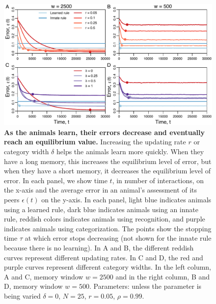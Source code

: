 \begin{figure}
\includegraphics[width=6.85in]{figures/speed_accuracy_tradeoff.pdf}
\caption{\sffamily\small\textbf{As the animals learn, their errors decrease and eventually reach an equilibrium value.} Increasing the updating rate $r$ or category width $\delta$ helps the animals learn more quickly. When they have a long memory, this increases the equilibrium level of error, but when they have a short memory, it decreases the equilibrium level of error. In each panel, we show time $t$, in number of interactions, on the x-axis and the average error in an animal's assessment of its peers $\epsilon(t)$ on the y-axis. In each panel, light blue indicates animals using a learned rule, dark blue indicates animals using an innate rule, reddish colors indicates animals using recognition, and purple indicates animals using categorization. The points show the stopping time $\tau$ at which error stops decreasing (not shown for the innate rule because there is no learning). In A and B, the different reddish curves represent different updating rates. In C and D, the red and purple curves represent different category widths. In the left column, A and C, memory window $w=2500$ and in the right column, B and D, memory window $w=500$. Parameters: unless the parameter is being varied $\delta=0$, $N=25$, $r=0.05$, $\rho=0.99$.}
\label{tradeoff}
\end{figure}

